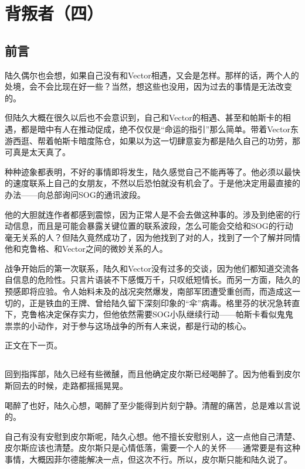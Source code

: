 \chapter{背叛者（四）}

\section*{前言}

陆久偶尔也会想，如果自己没有和Vector相遇，又会是怎样。那样的话，两个人的处境，会不会比现在好一些？当然，想这些也没用，因为过去的事情是无法改变的。

但陆久大概在很久以后也不会意识到，自己和Vector的相遇、甚至和帕斯卡的相遇，都是暗中有人在推动促成，绝不仅仅是“命运的指引”那么简单。带着Vector东游西逛、帮着帕斯卡暗度陈仓，如果以为这一切肆意妄为都是陆久自己的功劳，那可真是太天真了。

\lineseparator

种种迹象都表明，不好的事情即将发生，陆久感觉自己不能再等了。他必须以最快的速度联系上自己的女朋友，不然以后恐怕就没有机会了。于是他决定用最直接的办法——向总部询问SOG的通讯波段。

他的大胆就连作者都感到震惊，因为正常人是不会去做这种事的。涉及到绝密的行动信息，而且是可能会暴露关键位置的联系波段，怎么可能会交给和SOG的行动毫无关系的人？但陆久竟然成功了，因为他找到了对的人，找到了一个了解并同情他和克鲁格、和Vector之间的微妙关系的人。

战争开始后的第一次联系，陆久和Vector没有过多的交谈，因为他们都知道交流各自信息的危险性。只言片语装不下感慨万千，只叹纸短情长。而另一方面，陆久的预感即将应验。令人始料未及的战况突然爆发，南部军团遭受重创而，而造成这一切的，正是铁血的王牌、曾给陆久留下深刻印象的“伞”病毒。格里芬的状况急转直下，克鲁格决定保存实力，但他依然需要SOG小队继续行动——帕斯卡看似鬼鬼祟祟的小动作，对于参与这场战争的所有人来说，都是行动的核心。

正文在下一页。

\section*{}

回到指挥部，陆久已经有些微醺，而且他确定皮尔斯已经喝醉了。因为他看到皮尔斯回去的时候，走路都摇摇晃晃。

喝醉了也好，陆久心想，喝醉了至少能得到片刻宁静。清醒的痛苦，总是难以言说的。

自己有没有安慰到皮尔斯呢，陆久心想。他不擅长安慰别人，这一点他自己清楚、皮尔斯应该也清楚。皮尔斯只是心情低落，需要一个人的关怀——通常要是有这种事情，大概因菲尔德能解决一点，但这次不行。所以，皮尔斯只能和陆久说了。

